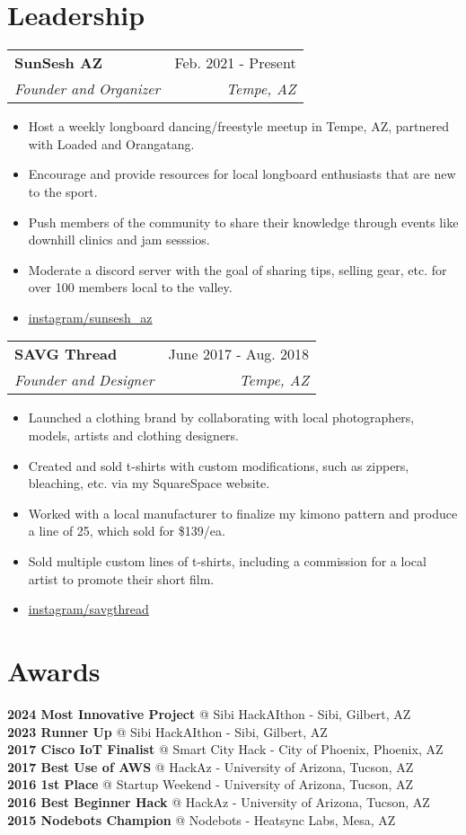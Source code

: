 \documentclass[letterpaper,11pt]{article}
\makeatletter
\newcommand{\resumeItem}[1]{
  \item\small{
    {#1 \vspace{-2pt}}
  }
}
\newcommand{\resumeSubheading}[4]{
  \vspace{-2pt}\item
    \begin{tabular*}{0.97\textwidth}[t]{l@{\extracolsep{\fill}}r}
      \textbf{#1} & #2 \\
      \textit{\small#3} & \textit{\small #4} \\
    \end{tabular*}\vspace{-7pt}
}
\newcommand{\resumeItemListStart}{\begin{itemize}}
\newcommand{\resumeItemListEnd}{\end{itemize}\vspace{-5pt}}
\makeatother
\begin{document}
%
\section{Leadership}
\begin{itemize}[leftmargin=0.15in, label={}]
   \small{\item{
    \resumeSubheading
      {SunSesh AZ}{Feb. 2021 - Present}
      {Founder and Organizer}{Tempe, AZ}
      \resumeItemListStart
        \resumeItem{Host a weekly longboard dancing/freestyle meetup in Tempe, AZ, partnered with Loaded and Orangatang.}
        \resumeItem{Encourage and provide resources for local longboard enthusiasts that are new to the sport.}
        \resumeItem{Push members of the community to share their knowledge through events like downhill clinics and jam sesssios.}
        \resumeItem{Moderate a discord server with the goal of sharing tips, selling gear, etc. for over 100 members local to the valley.}
        \resumeItem{\href{https://www.instagram.com/sunsesh\_az}{\underline{instagram/sunsesh\_az}}}
      \resumeItemListEnd
    \resumeSubheading
      {SAVG Thread}{June 2017 - Aug. 2018}
      {Founder and Designer}{Tempe, AZ}
      \resumeItemListStart
        \resumeItem{Launched a clothing brand by collaborating with local photographers, models, artists and clothing designers.}
        \resumeItem{Created and sold t-shirts with custom modifications, such as zippers, bleaching, etc. via my SquareSpace website.}
        \resumeItem{Worked with a local manufacturer to finalize my kimono pattern and produce a line of 25, which sold for \$139/ea.}
        \resumeItem{Sold multiple custom lines of t-shirts, including a commission for a local artist to promote their short film.}
        \resumeItem{\href{https://www.instagram.com/savgthread}{\underline{instagram/savgthread}}}
      \resumeItemListEnd
   }}
\end{itemize}

%
\section{Awards}
\begin{itemize}[leftmargin=0.15in, label={}]
   \small{\item{
    \textbf{2024 Most Innovative Project}{ @ Sibi HackAIthon - Sibi, Gilbert, AZ} \\
    \textbf{2023 Runner Up}{ @ Sibi HackAIthon - Sibi, Gilbert, AZ} \\
    \textbf{2017 Cisco IoT Finalist}{ @ Smart City Hack - City of Phoenix, Phoenix, AZ} \\
    \textbf{2017 Best Use of AWS}{ @ HackAz - University of Arizona, Tucson, AZ} \\
    \textbf{2016 1st Place}{ @ Startup Weekend - University of Arizona, Tucson, AZ} \\
    \textbf{2016 Best Beginner Hack}{ @ HackAz - University of Arizona, Tucson, AZ} \\
    \textbf{2015 Nodebots Champion}{ @ Nodebots - Heatsync Labs, Mesa, AZ} \\
   }}
\end{itemize}

\end{document}

